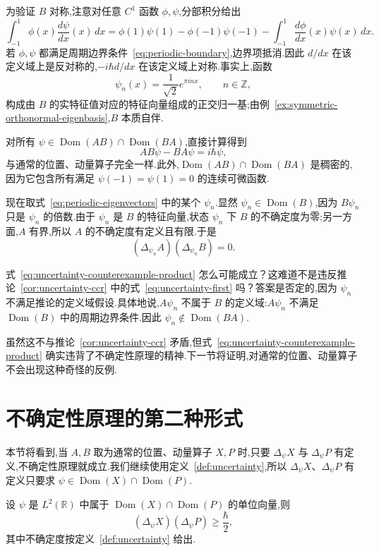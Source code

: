 为验证 $B$ 对称,注意对任意 $C^1$ 函数 $\phi,\psi$,分部积分给出
\[
\int_{-1}^{1}\phi(x)\frac{d\psi}{dx}(x)\,dx
=\phi(1)\psi(1)-\phi(-1)\psi(-1)
-\int_{-1}^{1}\frac{d\phi}{dx}(x)\psi(x)\,dx.
\]
若 $\phi,\psi$ 都满足周期边界条件~\eqref{eq:periodic-boundary},边界项抵消.因此 $d/dx$ 在该定义域上是反对称的,$-i\hbar d/dx$ 在该定义域上对称.事实上,函数
\[
\psi_n(x)=\frac1{\sqrt2}e^{\pi i n x},
\qquad n\in\mathbb Z,
\label{eq:periodic-eigenvectors}
\]
构成由 $B$ 的实特征值对应的特征向量组成的正交归一基;由例~\ref{ex:symmetric-orthonormal-eigenbasis},$B$ 本质自伴.

对所有 $\psi\in\operatorname{Dom}(AB)\cap\operatorname{Dom}(BA)$,直接计算得到
\[
AB\psi-BA\psi=i\hbar\psi,
\label{eq:counterexample-commutator}
\]
与通常的位置、动量算子完全一样.此外,$\operatorname{Dom}(AB)\cap\operatorname{Dom}(BA)$ 是稠密的,因为它包含所有满足 $\psi(-1)=\psi(1)=0$ 的连续可微函数.

现在取式~\eqref{eq:periodic-eigenvectors} 中的某个 $\psi_n$.显然 $\psi_n\in\operatorname{Dom}(B)$,因为 $B\psi_n$ 只是 $\psi_n$ 的倍数.由于 $\psi_n$ 是 $B$ 的特征向量,状态 $\psi_n$ 下 $B$ 的不确定度为零;另一方面,$A$ 有界,所以 $A$ 的不确定度有定义且有限.于是
\[
(\Delta_{\psi_n}A)(\Delta_{\psi_n}B)=0.
\label{eq:uncertainty-counterexample-product}
\]

式~\eqref{eq:uncertainty-counterexample-product} 怎么可能成立？这难道不是违反推论~\ref{cor:uncertainty-ccr} 中的式~\eqref{eq:uncertainty-first} 吗？答案是否定的,因为 $\psi_n$ 不满足推论的定义域假设.具体地说,$A\psi_n$ 不属于 $B$ 的定义域:$A\psi_n$ 不满足 $\operatorname{Dom}(B)$ 中的周期边界条件.因此 $\psi_n\notin\operatorname{Dom}(BA)$.

虽然这不与推论~\ref{cor:uncertainty-ccr} 矛盾,但式~\eqref{eq:uncertainty-counterexample-product} 确实违背了不确定性原理的精神.下一节将证明,对通常的位置、动量算子不会出现这种奇怪的反例.

\section{不确定性原理的第二种形式}
\label{sec:uncertainty-second}

本节将看到,当 $A,B$ 取为通常的位置、动量算子 $X,P$ 时,只要 $\Delta_\psi X$ 与 $\Delta_\psi P$ 有定义,不确定性原理就成立.我们继续使用定义~\ref{def:uncertainty},所以 $\Delta_\psi X$、$\Delta_\psi P$ 有定义只要求 $\psi\in\operatorname{Dom}(X)\cap\operatorname{Dom}(P)$.

\begin{theorem}[位置与动量的不确定性原理]\label{thm:uncertainty-strong}
设 $\psi$ 是 $L^2(\mathbb R)$ 中属于 $\operatorname{Dom}(X)\cap\operatorname{Dom}(P)$ 的单位向量,则
\[
(\Delta_\psi X)(\Delta_\psi P)\geq\frac{\hbar}{2},
\label{eq:uncertainty-strong}
\]
其中不确定度按定义~\ref{def:uncertainty} 给出.
\end{theorem}

